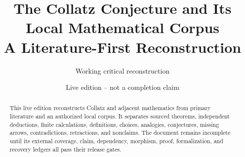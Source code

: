 \documentclass[11pt,letterpaper]{article}
\title{The Collatz Conjecture and Its Local Mathematical Corpus\\
\large A Literature-First Reconstruction}
\author{Working critical reconstruction}
\date{Live edition -- not a completion claim}
\theoremstyle{definition}
\theoremstyle{remark}
\begin{document}
\maketitle
\begin{abstract}
This live edition reconstructs Collatz and adjacent mathematics from primary
literature and an authorized local corpus.  It separates sourced theorems,
independent deductions, finite calculations, definitions, choices, analogies,
conjectures, missing arrows, contradictions, retractions, and nonclaims.  The
document remains incomplete until its external coverage, claim, dependency,
morphism, proof, formalization, and recovery ledgers all pass their release
gates.
\end{abstract}

\tableofcontents










\end{document}
